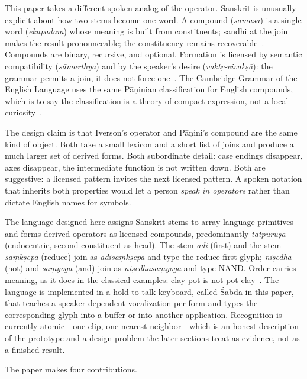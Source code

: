 \documentclass[manuscript, review, anonymous]{acmart}
\begin{document}
This paper takes a different spoken analog of the operator. Sanskrit is unusually explicit about how two stems become one word. A compound (\textit{sam{\=a}sa}) is a single word (\textit{ekapadam}) whose meaning is built from constituents; sandhi at the join makes the result pronounceable; the constituency remains recoverable~\cite{Satuluri2013Generation,Gillon2009Tagging,Joshi1968Samartha}. Compounds are binary, recursive, and optional. Formation is licensed by semantic compatibility (\textit{s{\=a}marthya}) and by the speaker's desire (\textit{vakt\d{r}-vivak{\d{s}}{\=a}}): the grammar permits a join, it does not force one~\cite{Satuluri2013Generation}. The Cambridge Grammar of the English Language uses the same P{\=a}{\d{n}}inian classification for English compounds, which is to say the classification is a theory of compact expression, not a local curiosity~\cite{Huddleston2002Cambridge}.

The design claim is that Iverson's operator and P{\=a}{\d{n}}ini's compound are the same kind of object. Both take a small lexicon and a short list of joins and produce a much larger set of derived forms. Both subordinate detail: case endings disappear, axes disappear, the intermediate function is not written down. Both are suggestive: a licensed pattern invites the next licensed pattern. A spoken notation that inherits both properties would let a person \emph{speak in operators} rather than dictate English names for symbols.

The language designed here assigns Sanskrit stems to array-language primitives and forms derived operators as licensed compounds, predominantly \textit{tatpuru{\d{s}}a} (endocentric, second constituent as head). The stem \textit{{\=a}di} (first) and the stem \textit{sa{\d{m}}k{\d{s}}epa} (reduce) join as \textit{{\=a}disa{\d{m}}k{\d{s}}epa} and type the reduce-first glyph; \textit{ni{\d{s}}edha} (not) and \textit{sa{\d{m}}yoga} (and) join as \textit{ni{\d{s}}edhasa{\d{m}}yoga} and type NAND. Order carries meaning, as it does in the classical examples: clay-pot is not pot-clay~\cite{Satuluri2013Generation}. The language is implemented in a hold-to-talk keyboard, called {\'S}abda in this paper, that teaches a speaker-dependent vocalization per form and types the corresponding glyph into a buffer or into another application. Recognition is currently atomic---one clip, one nearest neighbor---which is an honest description of the prototype and a design problem the later sections treat as evidence, not as a finished result.

The paper makes four contributions.
\end{document}
